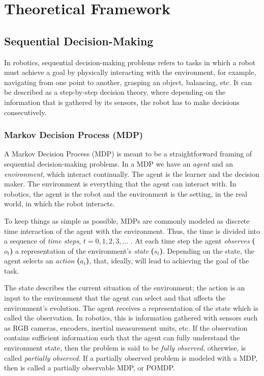 \chapter{Theoretical Framework}
\section{Sequential Decision-Making}
In robotics, sequential decision-making problems refers to tasks in which a robot must achieve a goal by physically interacting with the environment, for example, navigating from one point to another, grasping an object, balancing, etc. It can be described as a step-by-step decision theory, where depending on the information that is gathered by its sensors, the robot has to make decisions consecutively.

\subsection{Markov Decision Process (MDP)}
A Markov Decision Process (MDP) is meant to be a straightforward framing of sequential decision-making problems. In a MDP we have an \emph{agent} and an \emph{environment}, which interact continually. The agent is the learner and the decision maker. The environment is everything that the agent can interact with\cite{sutton}. In robotics, the agent is the robot and the environment is the setting, in the real world, in which the robot interacts.

To keep things as simple as possible, MDPs are commonly modeled as discrete time interaction of the agent with the environment. Thus, the time is divided into a sequence of \emph{time steps}, $t=0,1,2,3,...$ . At each time step the agent \emph{observes} \textbf{($o_{t}$)} a representation of the environment's \emph{state} \textbf{($s_{t}$)}. Depending on the state, the agent selects an \emph{action} \textbf{($a_{t}$)}, that, ideally, will lead to achieving the goal of the task.

The state describes the current situation of the environment; the action is an input to the environment that the agent can select and that affects the environment's evolution. The agent receives a representation of the state which is called the observation. In robotics, this is information gathered with sensors such as RGB cameras, encoders, inertial measurement units, etc. If the observation contains sufficient information such that the agent can fully understand the environment state, then the problem is said to be \emph{fully observed}, otherwise, is called \emph{partially observed}. If a partially observed problem is modeled with a MDP, then is called a partially observable MDP, or POMDP.

